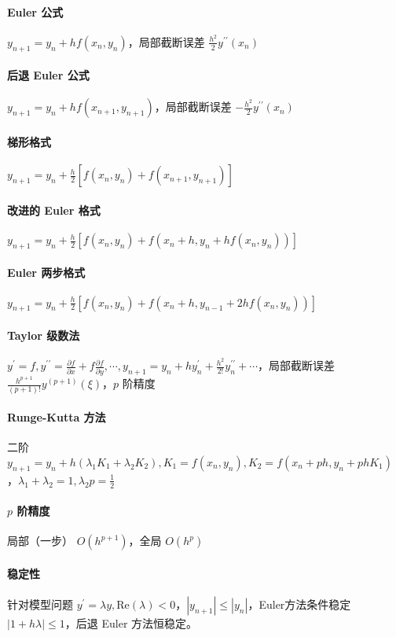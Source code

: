 \documentclass[twocolumn]{ctexart}
\begin{document}
\paragraph{Euler 公式} $y_{n+1}=y_n+hf(x_n,y_n)$，局部截断误差 $\frac{h^2}{2}y^{\prime\prime}(x_n)$
\paragraph{后退 Euler 公式} $y_{n+1}=y_n+hf(x_{n+1},y_{n+1})$，局部截断误差 $-\frac{h^2}{2}y^{\prime\prime}(x_n)$
\paragraph{梯形格式}$y_{n+1}=y_n+\frac{h}{2}[f(x_n,y_n)+f(x_{n+1},y_{n+1})]$
\paragraph{改进的 Euler 格式} $y_{n+1}=y_n+\frac{h}{2}[f(x_n,y_n)+f(x_n+h,y_n+hf(x_n,y_n))]$
\paragraph{Euler 两步格式} $y_{n+1}=y_n+\frac{h}{2}[f(x_n,y_n)+f(x_n+h,y_{n-1}+2hf(x_n,y_n))]$


\paragraph{Taylor 级数法} $y^\prime=f,y^{\prime\prime}=\frac{\partial f}{\partial x}+f\frac{\partial f}{\partial y},\cdots,y_{n+1}=y_n+hy_n^\prime+\frac{h^2}{2!}y_n^{\prime\prime}+\cdots$，局部截断误差 $\frac{h^{p+1}}{(p+1)!}y^{(p+1)}(\xi)$，$p$ 阶精度
\paragraph{Runge-Kutta 方法} 二阶 $y_{n+1}=y_n+h(\lambda_1K_1+\lambda_2K_2),K_1=f(x_n,y_n),K_2=f(x_n+ph,y_n+phK_1)$，$\lambda_1+\lambda_2=1,\lambda_2p=\frac{1}{2}$

\paragraph{$p$ 阶精度} 局部（一步） $O(h^{p+1})$，全局 $O(h^p)$
\paragraph{稳定性}针对模型问题 $y^\prime=\lambda y,\text{Re}(\lambda)<0$，$|y_{n+1}|\leq |y_n|$，Euler方法条件稳定 $|1+h\lambda|\leq 1$，后退 Euler 方法恒稳定。
\end{document}
